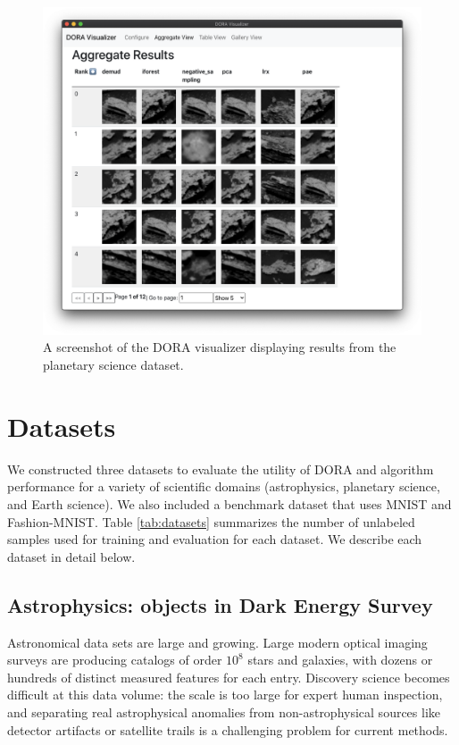 \documentclass[utf8]{frontiersFPHY} %
\begin{document}
\begin{figure}
  \centering
  \includegraphics[width=0.83\linewidth]{figures/doravis.png}
  \caption{A screenshot of the DORA visualizer displaying results from the
  planetary science dataset.}
  \label{fig:doravis}
\end{figure}

\section{Datasets}
We constructed three datasets to evaluate the utility of DORA and 
algorithm performance for a variety of scientific domains
(astrophysics, planetary science, and Earth science). We also included a 
benchmark dataset that uses MNIST and Fashion-MNIST. Table \ref{tab:datasets}
summarizes the number of unlabeled samples used for training and evaluation for
each dataset. We describe each dataset in detail below.

\subsection{Astrophysics: objects in Dark Energy Survey}
Astronomical data sets are large and growing. Large modern optical
imaging surveys are producing catalogs of order $10^8$ stars
and galaxies, with dozens or hundreds of distinct measured features
for each entry. Discovery science becomes difficult at this data
volume: the scale is too large for expert human inspection, and separating real
astrophysical anomalies from non-astrophysical sources like detector artifacts or
satellite trails is a challenging problem for current methods.
\end{document}

